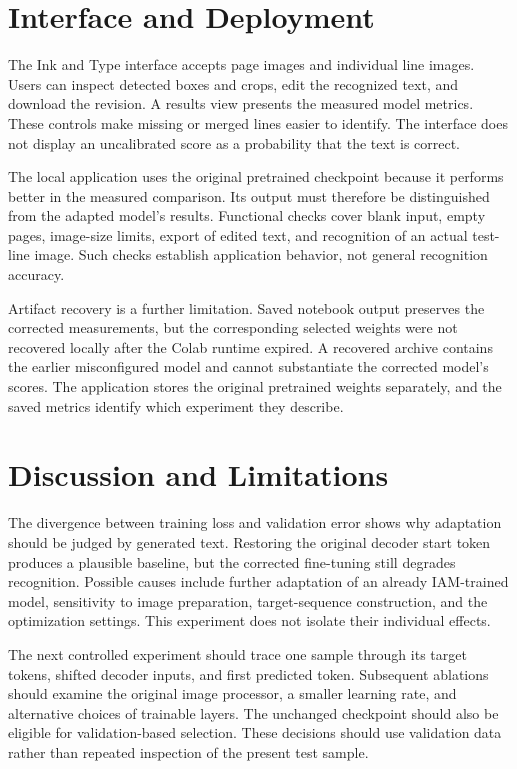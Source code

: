 \documentclass[conference]{IEEEtran}
\begin{document}
\section{Interface and Deployment}
The Ink and Type interface accepts page images and individual line images. Users can inspect detected boxes and crops, edit the recognized text, and download the revision. A results view presents the measured model metrics. These controls make missing or merged lines easier to identify. The interface does not display an uncalibrated score as a probability that the text is correct.

The local application uses the original pretrained checkpoint because it performs better in the measured comparison. Its output must therefore be distinguished from the adapted model's results. Functional checks cover blank input, empty pages, image-size limits, export of edited text, and recognition of an actual test-line image. Such checks establish application behavior, not general recognition accuracy.

Artifact recovery is a further limitation. Saved notebook output preserves the corrected measurements, but the corresponding selected weights were not recovered locally after the Colab runtime expired. A recovered archive contains the earlier misconfigured model and cannot substantiate the corrected model's scores. The application stores the original pretrained weights separately, and the saved metrics identify which experiment they describe.
\section{Discussion and Limitations}
The divergence between training loss and validation error shows why adaptation should be judged by generated text. Restoring the original decoder start token produces a plausible baseline, but the corrected fine-tuning still degrades recognition. Possible causes include further adaptation of an already IAM-trained model, sensitivity to image preparation, target-sequence construction, and the optimization settings. This experiment does not isolate their individual effects.

The next controlled experiment should trace one sample through its target tokens, shifted decoder inputs, and first predicted token. Subsequent ablations should examine the original image processor, a smaller learning rate, and alternative choices of trainable layers. The unchanged checkpoint should also be eligible for validation-based selection. These decisions should use validation data rather than repeated inspection of the present test sample.
\end{document}
